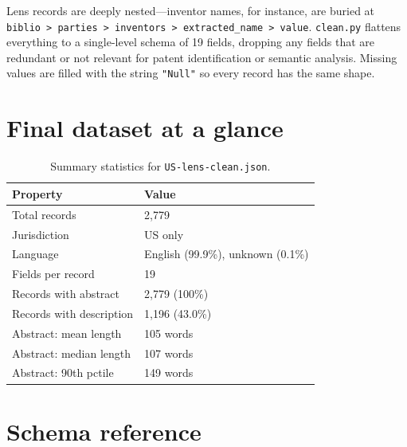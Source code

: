 \documentclass[11pt]{article}
\begin{document}
Lens records are deeply nested---inventor names, for instance, are buried at
\texttt{biblio > parties > inventors > extracted\_name > value}. \texttt{clean.py}
flattens everything to a single-level schema of 19 fields, dropping any fields that are
redundant or not relevant for patent identification or semantic analysis. Missing values
are filled with the string \texttt{"Null"} so every record has the same shape.

\section{Final dataset at a glance}
\label{sec:lens_final}

\begin{table}[H]
  \centering
  \begin{tabular}{ll}
    \toprule
    \textbf{Property} & \textbf{Value} \\
    \midrule
    Total records             & 2,779 \\
    Jurisdiction              & US only \\
    Language                  & English (99.9\%), unknown (0.1\%) \\
    Fields per record         & 19 \\
    Records with abstract     & 2,779 (100\%) \\
    Records with description  & 1,196 (43.0\%) \\
    Abstract: mean length     & 105 words \\
    Abstract: median length   & 107 words \\
    Abstract: 90th pctile     & 149 words \\
    \bottomrule
  \end{tabular}
  \caption{Summary statistics for \texttt{US-lens-clean.json}.}
  \label{tab:lens_summary}
\end{table}

\section{Schema reference}
\label{sec:lens_schema}
\end{document}
